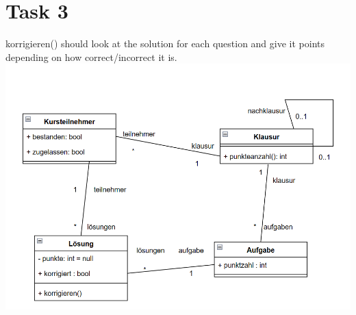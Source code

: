 \chapter{Task 3}
\begin{parlist}
  \item korrigieren() should look at the solution for each question and give it points depending on how correct/incorrect it is.
  \includegraphics[width=\textwidth]{Immagini/aufg3}
\end{parlist}
